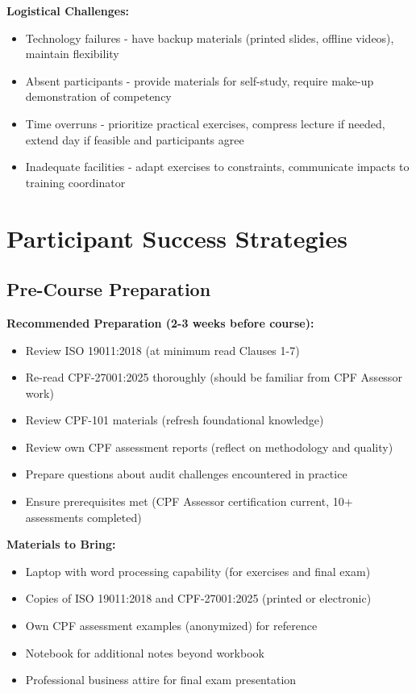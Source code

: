 \documentclass[11pt,a4paper]{article}
\begin{document}
\textbf{Logistical Challenges:}
\begin{itemize}
\item Technology failures - have backup materials (printed slides, offline videos), maintain flexibility
\item Absent participants - provide materials for self-study, require make-up demonstration of competency
\item Time overruns - prioritize practical exercises, compress lecture if needed, extend day if feasible and participants agree
\item Inadequate facilities - adapt exercises to constraints, communicate impacts to training coordinator
\end{itemize}

\section{Participant Success Strategies}

\subsection{Pre-Course Preparation}

\textbf{Recommended Preparation (2-3 weeks before course):}
\begin{itemize}
\item Review ISO 19011:2018 (at minimum read Clauses 1-7)
\item Re-read CPF-27001:2025 thoroughly (should be familiar from CPF Assessor work)
\item Review CPF-101 materials (refresh foundational knowledge)
\item Review own CPF assessment reports (reflect on methodology and quality)
\item Prepare questions about audit challenges encountered in practice
\item Ensure prerequisites met (CPF Assessor certification current, 10+ assessments completed)
\end{itemize}

\textbf{Materials to Bring:}
\begin{itemize}
\item Laptop with word processing capability (for exercises and final exam)
\item Copies of ISO 19011:2018 and CPF-27001:2025 (printed or electronic)
\item Own CPF assessment examples (anonymized) for reference
\item Notebook for additional notes beyond workbook
\item Professional business attire for final exam presentation
\end{itemize}
\end{document}
